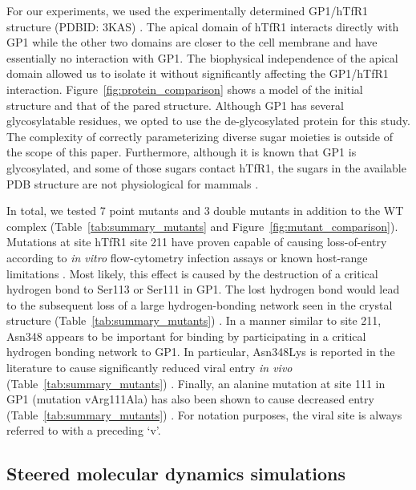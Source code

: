 \documentclass[journal=jacsat,manuscript=article]{achemso}
\begin{document}
For our experiments, we used the experimentally determined GP1/hTfR1 structure (PDBID: 3KAS) \cite{Abraham2010}. The apical domain of hTfR1 interacts directly with GP1 while the other two domains are closer to the cell membrane and have essentially no interaction with GP1. The biophysical independence of the apical domain allowed us to isolate it without significantly affecting the GP1/hTfR1 interaction. Figure~\ref{fig:protein_comparison} shows a model of the initial structure and that of the pared structure. Although GP1 has several glycosylatable residues, we opted to use the de-glycosylated protein for this study. The complexity of correctly parameterizing diverse sugar moieties is outside of the scope of this paper. Furthermore, although it is known that GP1 is glycosylated, and some of those sugars contact hTfR1, the sugars in the available PDB structure are not physiological for mammals \cite{Abraham2010}.

In total, we tested 7 point mutants and 3 double mutants in addition to the WT complex (Table~\ref{tab:summary_mutants} and Figure~\ref{fig:mutant_comparison}). Mutations at site hTfR1 site 211 have proven capable of causing loss-of-entry according to \textit{in vitro} flow-cytometry infection assays or known host-range limitations \cite{Rad2008,Rad20111,Rad20112}. Most likely, this effect is caused by the destruction of a critical hydrogen bond to Ser113 or Ser111 in GP1. The lost hydrogen bond would lead to the subsequent loss of a large hydrogen-bonding network seen in the crystal structure (Table~\ref{tab:summary_mutants}) \cite{Abraham2010}. In a manner similar to site 211, Asn348 appears to be important for binding by participating in a critical hydrogen bonding network \cite{Rad2008,Abraham2010} to GP1. In particular, Asn348Lys is reported in the literature to cause significantly reduced viral entry \textit{in vivo} (Table~\ref{tab:summary_mutants}) \cite{Rad2008,Abraham2010}. Finally, an alanine mutation at site 111 in GP1 (mutation vArg111Ala) has also been shown to cause decreased entry (Table~\ref{tab:summary_mutants}) \cite{Rad20112}. For notation purposes, the viral site is always referred to with a preceding `v'.  

\subsection{Steered molecular dynamics simulations}
\end{document}
